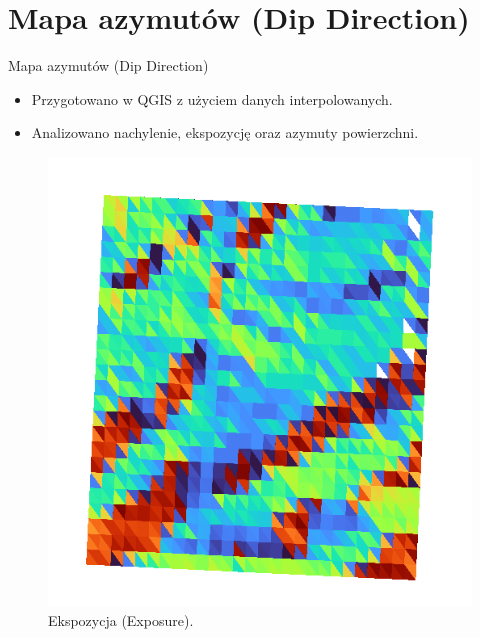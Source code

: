 \documentclass{beamer}
\begin{document}
\section{Mapa azymutów (Dip Direction)}
\begin{frame}{Mapa azymutów (Dip Direction)}
    \begin{itemize}
        \item Przygotowano w QGIS z użyciem danych interpolowanych.
        \item Analizowano nachylenie, ekspozycję oraz azymuty powierzchni.
    \end{itemize}
    \begin{figure}
        \centering
        \begin{minipage}{0.3\textwidth}
            \centering
            \includegraphics[width=\textwidth]{Eks.png}
            \caption{Ekspozycja (Exposure).}
        \end{minipage}
        \hspace{0.2cm} %
        \begin{minipage}{0.3\textwidth}
            \centering

\end{minipage}
\end{figure}
\end{frame}
\end{document}
